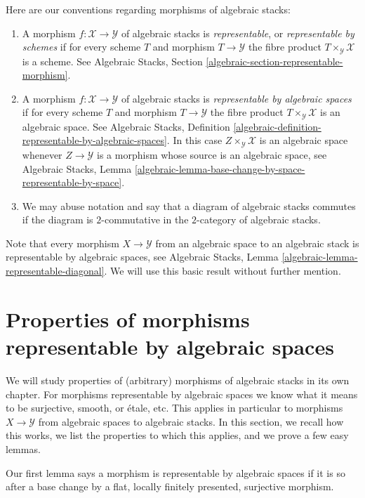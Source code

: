 Here are our conventions regarding morphisms of algebraic stacks:
\begin{enumerate}
\item A morphism $f : \mathcal{X} \to \mathcal{Y}$
of algebraic stacks is {\it representable}, or
{\it representable by schemes} if for every scheme
$T$ and morphism $T \to \mathcal{Y}$ the fibre product
$T \times_\mathcal{Y} \mathcal{X}$ is a scheme.
See
Algebraic Stacks, Section \ref{algebraic-section-representable-morphism}.
\item A morphism $f : \mathcal{X} \to \mathcal{Y}$
of algebraic stacks is {\it representable by algebraic spaces}
if for every scheme $T$ and morphism $T \to \mathcal{Y}$ the fibre product
$T \times_\mathcal{Y} \mathcal{X}$ is an algebraic space.
See Algebraic Stacks,
Definition \ref{algebraic-definition-representable-by-algebraic-spaces}.
In this case $Z \times_\mathcal{Y} \mathcal{X}$ is an algebraic
space whenever $Z \to \mathcal{Y}$ is a morphism whose source is
an algebraic space, see
Algebraic Stacks,
Lemma \ref{algebraic-lemma-base-change-by-space-representable-by-space}.
\item We may abuse notation and say that a diagram of algebraic stacks
commutes if the diagram is $2$-commutative in the $2$-category of
algebraic stacks.
\end{enumerate}
Note that every morphism $X \to \mathcal{Y}$ from an algebraic space
to an algebraic stack is representable by algebraic spaces, see
Algebraic Stacks, Lemma \ref{algebraic-lemma-representable-diagonal}.
We will use this basic result without further mention.

\section{Properties of morphisms representable by algebraic spaces}
\label{stacks-properties-section-properties-morphisms}
We will study properties of (arbitrary) morphisms of algebraic stacks in its
own chapter. For morphisms representable by algebraic spaces we know what
it means to be surjective, smooth, or \'etale, etc. This applies in particular
to morphisms $X \to \mathcal{Y}$ from algebraic spaces to algebraic stacks.
In this section, we recall how this works, we list the properties to which
this applies, and we prove a few easy lemmas.

\medskip\noindent
Our first lemma says a morphism is representable by algebraic spaces
if it is so after a base change by a flat,
locally finitely presented, surjective morphism.

